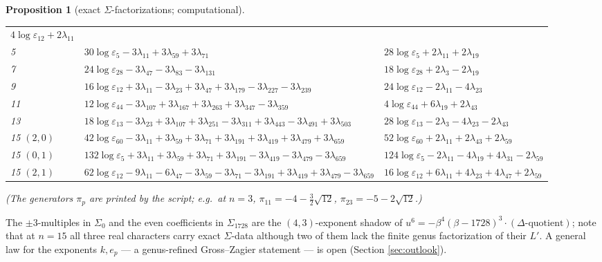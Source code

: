 \documentclass[11pt]{amsart}
\numberwithin{equation}{section}
\theoremstyle{plain}
\newtheorem{proposition}[theorem]{Proposition}
\theoremstyle{definition}
\theoremstyle{remark}
\newcommand{\eps}{\varepsilon}
\begin{document}
\begin{proposition}[exact $\Sigma$-factorizations; computational]
\begin{center}
\begin{tabular}{@{}lp{6.2cm}p{4.5cm}@{}}
$4\log\eps_{12} + 2\lambda_{11}$\\
5 & $30\log\eps_5 - 3\lambda_{11} + 3\lambda_{59} + 3\lambda_{71}$ &
$28\log\eps_5 + 2\lambda_{11} + 2\lambda_{19}$\\
7 & $24\log\eps_{28} - 3\lambda_{47} - 3\lambda_{83} - 3\lambda_{131}$ &
$18\log\eps_{28} + 2\lambda_3 - 2\lambda_{19}$\\
9 & $16\log\eps_{12} + 3\lambda_{11} - 3\lambda_{23} + 3\lambda_{47} +
3\lambda_{179} - 3\lambda_{227} - 3\lambda_{239}$ &
$24\log\eps_{12} - 2\lambda_{11} - 4\lambda_{23}$\\
11 & $12\log\eps_{44} - 3\lambda_{107} + 3\lambda_{167} + 3\lambda_{263} +
3\lambda_{347} - 3\lambda_{359}$ &
$4\log\eps_{44} + 6\lambda_{19} + 2\lambda_{43}$\\
13 & $18\log\eps_{13} - 3\lambda_{23} + 3\lambda_{107} + 3\lambda_{251} -
3\lambda_{311} + 3\lambda_{443} - 3\lambda_{491} + 3\lambda_{503}$ &
$28\log\eps_{13} - 2\lambda_3 - 4\lambda_{23} - 2\lambda_{43}$\\
15 $(2,0)$ & $42\log\eps_{60} - 3\lambda_{11} + 3\lambda_{59} +
3\lambda_{71} + 3\lambda_{191} + 3\lambda_{419} + 3\lambda_{479} +
3\lambda_{659}$ &
$52\log\eps_{60} + 2\lambda_{11} + 2\lambda_{43} + 2\lambda_{59}$\\
15 $(0,1)$ & $132\log\eps_5 + 3\lambda_{11} + 3\lambda_{59} +
3\lambda_{71} + 3\lambda_{191} - 3\lambda_{419} - 3\lambda_{479} -
3\lambda_{659}$ &
$124\log\eps_5 - 2\lambda_{11} - 4\lambda_{19} + 4\lambda_{31} -
2\lambda_{59}$\\
15 $(2,1)$ & $62\log\eps_{12} - 9\lambda_{11} - 6\lambda_{47} -
3\lambda_{59} - 3\lambda_{71} - 3\lambda_{191} + 3\lambda_{419} +
3\lambda_{479} - 3\lambda_{659}$ &
$16\log\eps_{12} + 6\lambda_{11} + 4\lambda_{23} + 4\lambda_{47} +
2\lambda_{59}$\\
\bottomrule
\end{tabular}
\end{center}
(The generators $\pi_p$ are printed by the script; e.g.\ at $n = 3$,
$\pi_{11} = -4 - \tfrac32\sqrt{12}$, $\pi_{23} = -5 - 2\sqrt{12}$.)
\end{proposition}

The $\pm3$-multiples in $\Sigma_0$ and the even coefficients in
$\Sigma_{1728}$ are the $(4,3)$-exponent shadow of $u^6 =
-\beta^4(\beta - 1728)^3\cdot(\Delta\text{-quotient})$; note that at $n =
15$ all three real characters carry exact $\Sigma$-data although two of
them lack the finite genus factorization of their $L'$.  A general law
for the exponents $k, e_p$ --- a genus-refined Gross--Zagier statement ---
is open (Section \ref{sec:outlook}).
\end{document}
